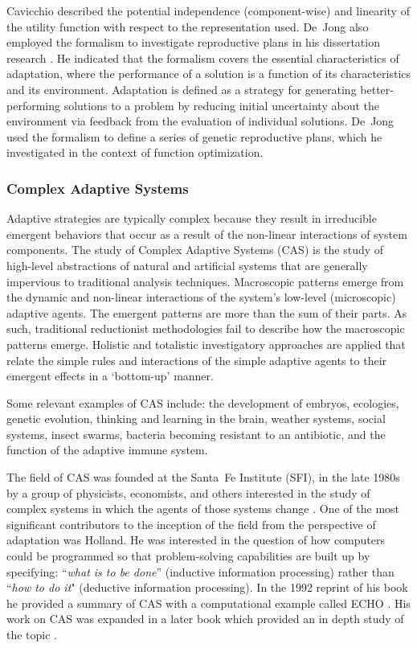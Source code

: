 Cavicchio described the potential independence (component-wise) and linearity of the utility function with respect to the representation used. De~Jong also employed the formalism to investigate reproductive plans in his dissertation research \cite{Jong1975}. He indicated that the formalism covers the essential characteristics of adaptation, where the performance of a solution is a function of its characteristics and its environment. Adaptation is defined as a strategy for generating better-performing solutions to a problem by reducing initial uncertainty about the environment via feedback from the evaluation of individual solutions. De~Jong used the formalism to define a series of genetic reproductive plans, which he investigated in the context of function optimization.

\subsubsection{Complex Adaptive Systems}
Adaptive strategies are typically complex because they result in irreducible emergent behaviors that occur as a result of the non-linear interactions of system components.
The study of Complex Adaptive Systems (CAS) is the study of high-level abstractions of natural and artificial systems that are generally impervious to traditional analysis techniques. Macroscopic patterns emerge from the dynamic and non-linear interactions of the system's low-level (microscopic) adaptive agents. The emergent patterns are more than the sum of their parts. As such, traditional reductionist methodologies fail to describe how the macroscopic patterns emerge. Holistic and totalistic investigatory approaches are applied that relate the simple rules and interactions of the simple adaptive agents to their emergent effects in a `bottom-up' manner. 

Some relevant examples of CAS include: the development of embryos, ecologies, genetic evolution, thinking and learning in the brain, weather systems, social systems, insect swarms, bacteria becoming resistant to an antibiotic, and the function of the adaptive immune system.

The field of CAS was founded at the Santa~Fe Institute (SFI), in the late 1980s by a group of physicists, economists, and others interested in the study of complex systems in which the agents of those systems change \cite{Anderson1988}. One of the most significant contributors to the inception of the field from the perspective of adaptation was Holland. He was interested in the question of how computers could be programmed so that problem-solving capabilities are built up by specifying: ``\emph{what is to be done}'' (inductive information processing) rather than ``\emph{how to do it}" (deductive information processing). In the 1992 reprint of his book he provided a summary of CAS with a computational example called ECHO \cite{Holland1975}. His work on CAS was expanded in a later book which provided an in depth study of the topic \cite{Holland1995}.
 
